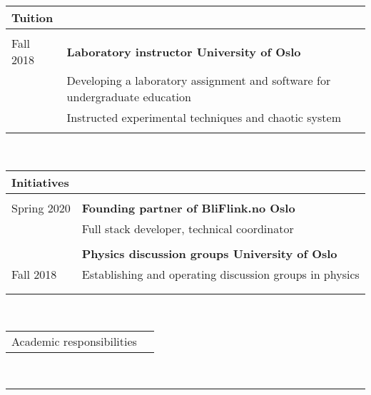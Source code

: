 \documentclass[letterpaper,9pt,oneside]{article}
\begin{document}
\noindent 
\begin{tabular}{@{} l l l} 
	\large{Tuition}\vspace{1mm}& \hspace{14cm} & \\ \hline \vspace{2mm} &&\\
	Fall 2018 \hspace{14mm} & \textbf{Laboratory instructor \hspace{2mm}\textbar\hspace{2mm} University of Oslo}& \\
	& Developing a laboratory assignment and software for undergraduate education& \\ &	Instructed experimental techniques and chaotic system& \\ &  \end{tabular} \vspace{5mm}  \\ 
\noindent 
\begin{tabular}{@{} l l } 
	\large{Initiatives}\vspace{1mm}& \hspace{15.5cm} \\ \hline \vspace{2mm} &\\
	Spring 2020 \hspace{0.9cm} & \textbf{Founding partner of BliFlink.no \hspace{2mm}\textbar\hspace{2mm} Oslo}\\
	& Full stack developer, technical coordinator\\
	&\\
	&	\textbf{Physics discussion groups\hspace{2mm}\textbar\hspace{2mm} University of Oslo} \\
	Fall 2018& Establishing and operating discussion groups in physics \\
	& \\ &  \end{tabular} \vspace{5mm}  \\ 
\noindent 
\begin{tabular}{@{} l l} 
\large{Academic responsibilities}\vspace{1mm}&  \end{tabular} \\  \hrule 
 \noindent      
\end{document}
